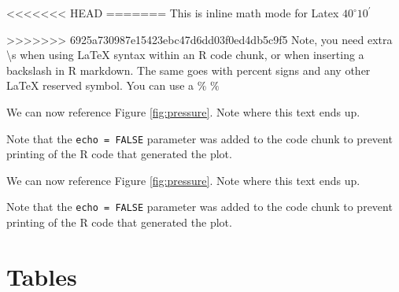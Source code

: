 \documentclass[12pt,]{article}
\begin{document}
<<<<<<< HEAD
=======
This is inline math mode for Latex \(40^\circ 10^\prime\)

>>>>>>> 6925a730987e15423ebc47d6dd03f0ed4db5c9f5
Note, you need extra \textbackslash{}s when using LaTeX syntax within an
R code chunk, or when inserting a backslash in R markdown. The same goes
with percent signs and any other LaTeX reserved symbol. You can use a \%
\(\%\)

We can now reference Figure \ref{fig:pressure}. Note where this text
ends up.

Note that the \texttt{echo\ =\ FALSE} parameter was added to the code
chunk to prevent printing of the R code that generated the plot.

\FloatBarrier

\FloatBarrier

We can now reference Figure \ref{fig:pressure}. Note where this text
ends up.

Note that the \texttt{echo\ =\ FALSE} parameter was added to the code
chunk to prevent printing of the R code that generated the plot.

\section{Tables}\label{tables}

\begin{table}[ht]
\centering
\caption{This is where you write your caption} 
\label{tab:Table_example}
\end{table}
\end{document}
